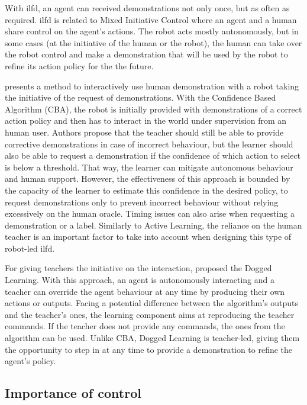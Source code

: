 With \gls{ilfd}, an agent can received demonstrations not only once, but as often as required. \gls{ilfd} is related to Mixed Initiative Control \citep{adams2004mixed} where an agent and a human share control on the agent's actions. The robot acts mostly autonomously, but in some cases (at the initiative of the human or the robot), the human can take over the robot control and make a demonstration that will be used by the robot to refine its action policy for the the future.

\cite{chernova2009} presents a method to interactively use human demonstration with a robot taking the initiative of the request of demonstrations. With the Confidence Based Algorithm (CBA), the robot is initially provided with demonstrations of a correct action policy and then has to interact in the world under supervision from an human user. Authors propose that the teacher should still be able to provide corrective demonstrations in case of incorrect behaviour, but the learner should also be able to request a demonstration if the confidence of which action to select is below a threshold. That way, the learner can mitigate autonomous behaviour and human support. However, the effectiveness of this approach is bounded by the capacity of the learner to estimate this confidence in the desired policy, to request demonstrations only to prevent incorrect behaviour without relying excessively on the human oracle. Timing issues can also arise when requesting a demonstration or a label. Similarly to Active Learning, the reliance on the human teacher is an important factor to take into account when designing this type of robot-led \gls{ilfd}.

For giving teachers the initiative on the interaction, \cite{grollman2007dogged} proposed the Dogged Learning. With this approach, an agent is autonomously interacting and a teacher can override the agent behaviour at any time by producing their own actions or outputs. Facing a potential difference between the algorithm's outputs and the teacher's ones, the learning component aims at reproducing the teacher commands. If the teacher does not provide any commands, the ones from the algorithm can be used. Unlike CBA, Dogged Learning is teacher-led, giving them the opportunity to step in at any time to provide a demonstration to refine the agent's policy.

\subsection{Importance of control}

